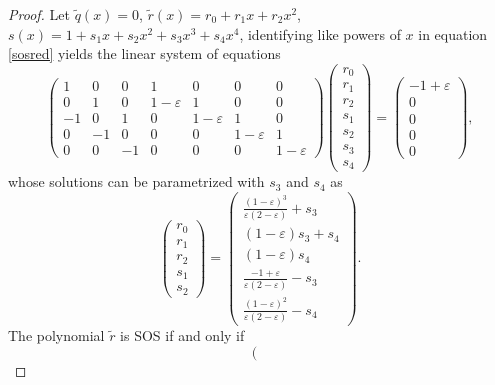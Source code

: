 \documentclass[10pt,a4paper]{amsart}
\begin{document}
\begin{proof}
Let ${\tilde{q}}(x)=0$, ${\tilde{r}}(x)=r_0+r_1 x +r_2 x^2$, $s(x)=1+s_1x+s_2x^2+s_3x^3+s_4x^4$, identifying like powers of $x$ in equation \eqref{sosred} yields the linear system of equations
\[
\left(\begin{array}{ccc|cccc}
1 & 0 & 0 & 1 & 0 & 0 & 0  \\
0 & 1 & 0 & 1-\varepsilon & 1 & 0 & 0 \\
-1 & 0 & 1 & 0 & 1-\varepsilon & 1 & 0\\
0 & -1 & 0 & 0 & 0 & 1-\varepsilon & 1 \\
0 & 0 & -1 & 0 & 0 & 0 & 1-\varepsilon
\end{array}\right)
\left(\begin{array}{c}
r_0 \\ r_1 \\ r_2 \\ \hline s_1  \\ s_2 \\ s_3 \\ s_4 
\end{array}\right)=
\left(\begin{array}{c}
-1+\varepsilon \\  0 \\ 0 \\ 0  \\ 0
\end{array}\right) ,
\]
whose solutions can be parametrized with $s_3$ and $s_4$ as
\begin{equation}\label{param3}
\left(\begin{array}{c}
r_0 \\ r_1 \\ r_2 \\ \hline s_1  \\ s_2
\end{array}\right)
=
\left(\begin{array}{c}
\frac{(1-\varepsilon)^3}{\varepsilon(2-\varepsilon)} + s_3 \\ (1-\varepsilon)s_3 + s_4 \\ (1-\varepsilon)s_4 \\ \hline \frac{-1+\varepsilon}{\varepsilon(2-\varepsilon)} - s_3 \\ \frac{(1-\varepsilon)^2}{\varepsilon(2-\varepsilon)} - s_4
\end{array}\right).
\end{equation}
The polynomial ${\tilde{r}}$ is SOS if and only if
\[
\left(\begin{array}{cc}

\end{array}\]
\end{proof}
\end{document}
